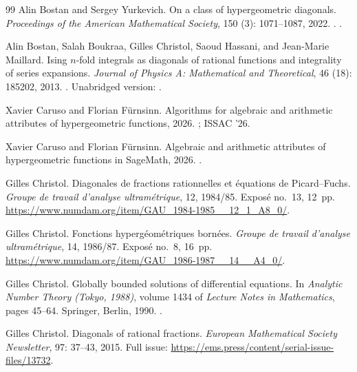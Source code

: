 \documentclass[11pt]{amsart}
\theoremstyle{definition}
\theoremstyle{remark}
\numberwithin{equation}{section}
\begin{document}
\begin{thebibliography}{99}
Alin Bostan and Sergey Yurkevich.
\newblock On a class of hypergeometric diagonals.
\newblock \emph{Proceedings of the American Mathematical Society}, 150
  (3): 1071--1087, 2022.
\newblock {}.
\newblock {}.

Alin Bostan, Salah Boukraa, Gilles Christol, Saoud Hassani, and Jean-Marie
  Maillard.
\newblock Ising $n$-fold integrals as diagonals of rational functions and
  integrality of series expansions.
\newblock \emph{Journal of Physics A: Mathematical and Theoretical},
  46 (18): 185202, 2013.
\newblock {}.
\newblock Unabridged version: .

Xavier Caruso and Florian F{\"u}rnsinn.
\newblock Algorithms for algebraic and arithmetic attributes of hypergeometric
  functions, 2026{}.
\newblock {}; ISSAC '26.

Xavier Caruso and Florian F{\"u}rnsinn.
\newblock Algebraic and arithmetic attributes of hypergeometric functions in
  {SageMath}, 2026{}.
\newblock {}.

Gilles Christol.
\newblock Diagonales de fractions rationnelles et {\'e}quations de
  {P}icard--{F}uchs.
\newblock \emph{Groupe de travail d'analyse ultram{\'e}trique}, 12, 1984/85.
\newblock Expos{\'e} no.~13, 12~pp.
\newblock \url{https://www.numdam.org/item/GAU_1984-1985__12_1_A8_0/}.

Gilles Christol.
\newblock Fonctions hyperg{\'e}om{\'e}triques born{\'e}es.
\newblock \emph{Groupe de travail d'analyse ultram{\'e}trique}, 14, 1986/87.
\newblock Expos{\'e} no.~8, 16~pp.
\newblock \url{https://www.numdam.org/item/GAU_1986-1987__14__A4_0/}.

Gilles Christol.
\newblock Globally bounded solutions of differential equations.
\newblock In \emph{Analytic Number Theory (Tokyo, 1988)}, volume 1434 of
  \emph{Lecture Notes in Mathematics}, pages 45--64. Springer, Berlin, 1990.
\newblock {}.

Gilles Christol.
\newblock Diagonals of rational fractions.
\newblock \emph{European Mathematical Society Newsletter}, 97: 37--43,
  2015.
\newblock Full issue: \url{https://ems.press/content/serial-issue-files/13732}.


\end{thebibliography}
\end{document}
